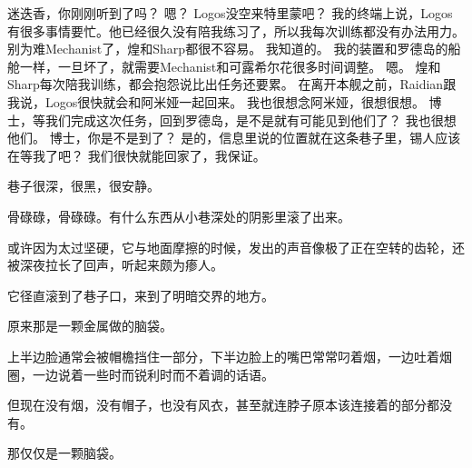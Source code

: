 \documentclass[openany]{book}
\begin{document}
\begin{dialogue}
     迷迭香，你刚刚听到了吗？
     嗯？
     Logos没空来特里蒙吧？
     我的终端上说，Logos有很多事情要忙。他已经很久没有陪我练习了，所以我每次训练都没有办法用力。
     别为难Mechanist了，煌和Sharp都很不容易。
     我知道的。
     我的装置和罗德岛的船舱一样，一旦坏了，就需要Mechanist和可露希尔花很多时间调整。
     嗯。
     煌和Sharp每次陪我训练，都会抱怨说比出任务还要累。
     在离开本舰之前，Raidian跟我说，Logos很快就会和阿米娅一起回来。
     我也很想念阿米娅，很想很想。
     博士，等我们完成这次任务，回到罗德岛，是不是就有可能见到他们了？
     我也很想他们。
     博士，你是不是到了？
     是的，信息里说的位置就在这条巷子里，锡人应该在等我了吧？
     我们很快就能回家了，我保证。
\end{dialogue}\par

巷子很深，很黑，很安静。\par
骨碌碌，骨碌碌。有什么东西从小巷深处的阴影里滚了出来。\par
或许因为太过坚硬，它与地面摩擦的时候，发出的声音像极了正在空转的齿轮，还被深夜拉长了回声，听起来颇为瘆人。\par
它径直滚到了巷子口，来到了明暗交界的地方。\par
原来那是一颗金属做的脑袋。\par
上半边脸通常会被帽檐挡住一部分，下半边脸上的嘴巴常常叼着烟，一边吐着烟圈，一边说着一些时而锐利时而不着调的话语。\par
但现在没有烟，没有帽子，也没有风衣，甚至就连脖子原本该连接着的部分都没有。\par
那仅仅是一颗脑袋。
\end{document}
